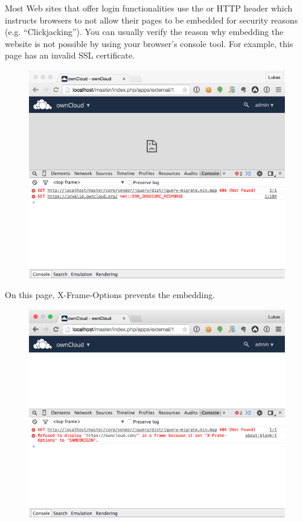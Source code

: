 \documentclass[letterpaper,10pt,english]{sphinxmanual}
\begin{document}
Most Web sites that offer login functionalities use the  or
 HTTP header which instructs browsers to not
allow their pages to be embedded for security reasons (e.g. ``Clickjacking''). You
can usually verify the reason why embedding the website is not possible by using
your browser's console tool. For example, this page has an invalid SSL
certificate.
\begin{figure}[htbp]
\centering

\includegraphics{external-sites-4.png}
\end{figure}

On this page, X-Frame-Options prevents the embedding.
\begin{figure}[htbp]
\centering

\includegraphics{external-sites-5.png}
\end{figure}
\end{document}
